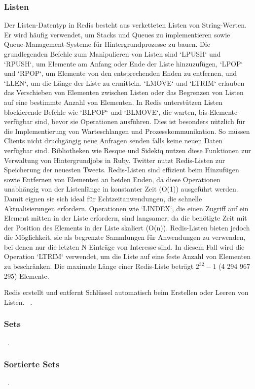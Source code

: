 \subsubsection{Listen}
Der Listen-Datentyp in Redis besteht aus verketteten Listen von String-Werten. Er wird häufig verwendet, um Stacks und Queues zu implementieren sowie Queue-Management-Systeme für Hintergrundprozesse zu bauen.
Die grundlegenden Befehle zum Manipulieren von Listen sind `LPUSH` und `RPUSH`, um Elemente am Anfang oder Ende der Liste hinzuzufügen, `LPOP` und `RPOP`, um Elemente von den entsprechenden Enden zu entfernen, und `LLEN`, um die Länge der Liste zu ermitteln.
`LMOVE` und `LTRIM` erlauben das Verschieben von Elementen zwischen Listen oder das Begrenzen von Listen auf eine bestimmte Anzahl von Elementen.
In Redis unterstützen Listen blockierende Befehle wie `BLPOP` und `BLMOVE`, die warten, bis Elemente verfügbar sind, bevor sie Operationen ausführen.
Dies ist besonders nützlich für die Implementierung von Warteschlangen und Prozesskommunikation. So müssen Clients nicht druchgängig neue Anfragen senden falls keine neuen Daten verfügbar sind.
Bibliotheken wie Resque und Sidekiq nutzen diese Funktionen zur Verwaltung von Hintergrundjobs in Ruby.
Twitter nutzt Redis-Listen zur Speicherung der neuesten Tweets.
Redis-Listen sind effizient beim Hinzufügen sowie Entfernen von Elementen an beiden Enden, da diese Operationen unabhängig von der Listenlänge in konstanter Zeit (O(1)) ausgeführt werden.
Damit eignen sie sich ideal für Echtzeitanwendungen, die schnelle Aktualisierungen erfordern. 
Operationen wie `LINDEX`, die einen Zugriff auf ein Element mitten in der Liste erfordern, sind langsamer, da die benötigte Zeit mit der Position des Elements in der Liste skaliert (O(n)).
Redis-Listen bieten jedoch die Möglichkeit, sie als begrenzte Sammlungen für Anwendungen zu verwenden, bei denen nur die letzten N Einträge von Interesse sind.
In diesem Fall wird die Operation `LTRIM` verwendet, um die Liste auf eine feste Anzahl von Elementen zu beschränken.
Die maximale Länge einer Redis-Liste beträgt \(2^{32} - 1\) (4 294 967 295) Elemente.

Redis erstellt und entfernt Schlüssel automatisch beim Erstellen oder Leeren von Listen.
~\cite{redis_lists_nodate}.
\subsubsection{Sets}
~\cite{redis_sets_nodate}.
\subsubsection{Sortierte Sets}
~\cite{redis_sorted-sets_nodate}.
